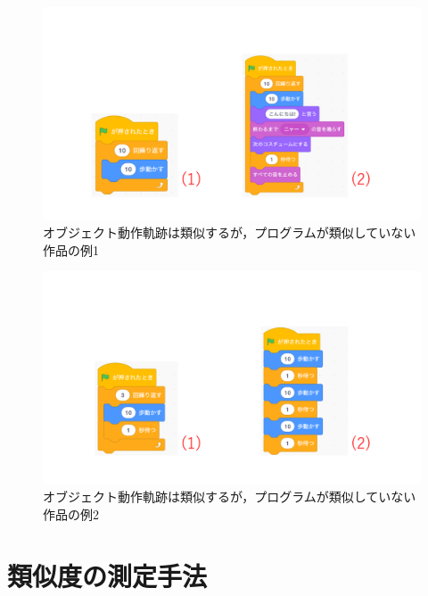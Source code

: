 \documentclass[T,J]{fose} %
\begin{document}
\begin{figure}[t]
	\centering
	\includegraphics[width=1.0\linewidth]{Okamoto_fig/pattern2-1.pdf}
	\caption{オブジェクト動作軌跡は類似するが，プログラムが類似していない作品の例1}
   \vspace{-2mm}
	\label{fig:pattern2-1}
\end{figure}

\begin{figure}[t]
	\centering
	\includegraphics[width=1.0\linewidth]{Okamoto_fig/pattern2-2.pdf}
	\caption{オブジェクト動作軌跡は類似するが，プログラムが類似していない作品の例2}
   \vspace{-2mm}
	\label{fig:pattern2-2}
\end{figure}



\section{類似度の測定手法}\label{sec:Similarity}
\end{document}
